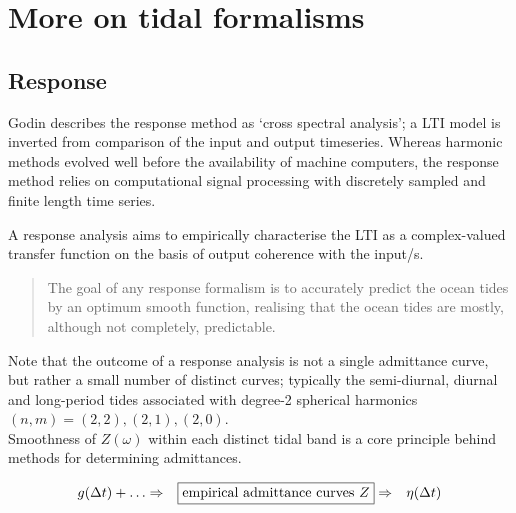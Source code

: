 
\chapter{More on tidal formalisms}
\label{appendix:tideFormalisms}



\section{Response}
Godin \citep{Godin:1991vx} describes the response method as `cross spectral analysis'; a LTI model is inverted from comparison of the input and output timeseries.   
Whereas harmonic methods evolved well before the availability of machine computers, the response method relies on computational signal processing with discretely sampled and finite length time series.


A response analysis aims to empirically characterise the LTI as a complex-valued transfer function on the basis of output coherence with the input/s. 
\begin{quotation}
The goal of any response formalism is to accurately predict the ocean tides by an optimum smooth function, realising that the ocean tides are mostly, although not completely, predictable.
\end{quotation}

Note that the outcome of a response analysis is not a single admittance curve, but rather a small number of distinct curves; typically the semi-diurnal, diurnal and long-period tides associated with degree-2 spherical harmonics $(n,m)=(2,2),(2,1),(2,0)$.\\
Smoothness of $Z(\omega)$ within each distinct tidal band is a core principle behind methods for determining admittances.  

\begin{align}
\label{E:response}
g(\Delta t) + \dots &\Rightarrow & \fbox{empirical admittance curves $Z$} &\Rightarrow & \mbox{$\eta(\Delta t)$}  %
\end{align}

